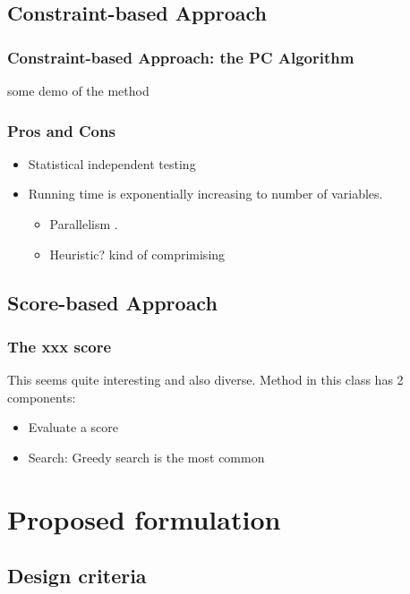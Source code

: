 \documentclass[10pt]{beamer}
\begin{document}
\subsection{Constraint-based Approach}%
\begin{frame}
\frametitle{Constraint-based Approach: the PC Algorithm}
some demo of the method
\end{frame}

\begin{frame}
\frametitle{Pros and Cons}
\begin{itemize}
    \item Statistical independent testing
    \item Running time is exponentially increasing to number of variables.
        \begin{itemize}
            \item Parallelism \cite{le_fast_2019}.
            \item Heuristic? kind of comprimising
        \end{itemize}
\end{itemize}
\end{frame}

\subsection{Score-based Approach}%
\begin{frame}
\frametitle{The xxx score}    
This seems quite interesting and also diverse. Method in this class has 2 components:
\begin{itemize}
    \item Evaluate a score
    \item Search: Greedy search is the most common
\end{itemize}
\end{frame}

\section{Proposed formulation}%
\label{sec:proposed_formulation}

\subsection{Design criteria}%
\label{sub:criteria}
\end{document}
